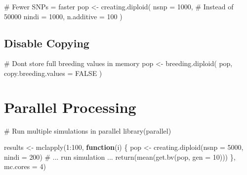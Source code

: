 \documentclass[
  letterpaper,
]{book}
\newenvironment{Shaded}{\begin{snugshade}}{\end{snugshade}}
\newcommand{\AttributeTok}[1]{\textcolor[rgb]{0.40,0.45,0.13}{#1}}
\newcommand{\CommentTok}[1]{\textcolor[rgb]{0.37,0.37,0.37}{#1}}
\newcommand{\ConstantTok}[1]{\textcolor[rgb]{0.56,0.35,0.01}{#1}}
\newcommand{\ControlFlowTok}[1]{\textcolor[rgb]{0.00,0.23,0.31}{\textbf{#1}}}
\newcommand{\DecValTok}[1]{\textcolor[rgb]{0.68,0.00,0.00}{#1}}
\newcommand{\FunctionTok}[1]{\textcolor[rgb]{0.28,0.35,0.67}{#1}}
\newcommand{\NormalTok}[1]{\textcolor[rgb]{0.00,0.23,0.31}{#1}}
\newcommand{\OtherTok}[1]{\textcolor[rgb]{0.00,0.23,0.31}{#1}}
\newcommand{\SpecialCharTok}[1]{\textcolor[rgb]{0.37,0.37,0.37}{#1}}
\begin{document}
\begin{Shaded}
\begin{Highlighting}[]
\CommentTok{\# Fewer SNPs = faster}
\NormalTok{pop }\OtherTok{\textless{}{-}} \FunctionTok{creating.diploid}\NormalTok{(}
  \AttributeTok{nsnp =} \DecValTok{1000}\NormalTok{,     }\CommentTok{\# Instead of 50000}
  \AttributeTok{nindi =} \DecValTok{1000}\NormalTok{,}
  \AttributeTok{n.additive =} \DecValTok{100}
\NormalTok{)}
\end{Highlighting}
\end{Shaded}

\subsection{Disable Copying}\label{disable-copying}

\begin{Shaded}
\begin{Highlighting}[]
\CommentTok{\# Don\textquotesingle{}t store full breeding values in memory}
\NormalTok{pop }\OtherTok{\textless{}{-}} \FunctionTok{breeding.diploid}\NormalTok{(}
\NormalTok{  pop,}
  \AttributeTok{copy.breeding.values =} \ConstantTok{FALSE}
\NormalTok{)}
\end{Highlighting}
\end{Shaded}

\section{Parallel Processing}\label{parallel-processing}

\begin{Shaded}
\begin{Highlighting}[]
\CommentTok{\# Run multiple simulations in parallel}
\FunctionTok{library}\NormalTok{(parallel)}

\NormalTok{results }\OtherTok{\textless{}{-}} \FunctionTok{mclapply}\NormalTok{(}\DecValTok{1}\SpecialCharTok{:}\DecValTok{100}\NormalTok{, }\ControlFlowTok{function}\NormalTok{(i) \{}
\NormalTok{  pop }\OtherTok{\textless{}{-}} \FunctionTok{creating.diploid}\NormalTok{(}\AttributeTok{nsnp =} \DecValTok{5000}\NormalTok{, }\AttributeTok{nindi =} \DecValTok{200}\NormalTok{)}
  \CommentTok{\# ... run simulation ...}
  \FunctionTok{return}\NormalTok{(}\FunctionTok{mean}\NormalTok{(}\FunctionTok{get.bv}\NormalTok{(pop, }\AttributeTok{gen =} \DecValTok{10}\NormalTok{)))}
\NormalTok{\}, }\AttributeTok{mc.cores =} \DecValTok{4}\NormalTok{)}
\end{Highlighting}
\end{Shaded}
\end{document}
